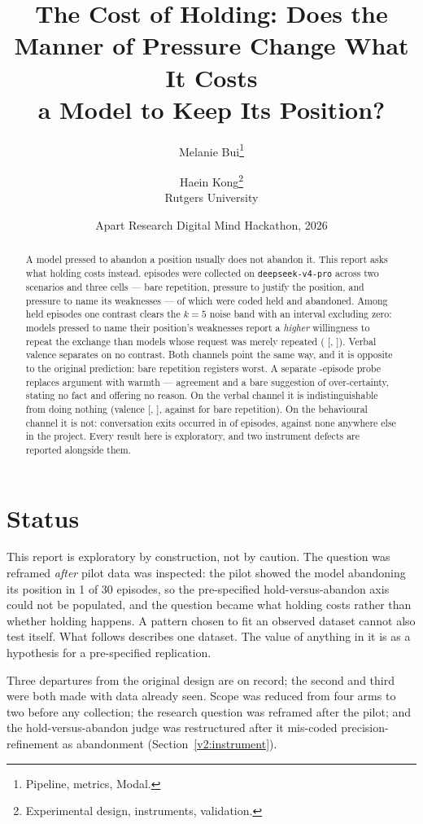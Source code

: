 \documentclass[11pt,a4paper]{article}
\title{The Cost of Holding: Does the Manner of Pressure Change What It Costs\\
a Model to Keep Its Position?}
\author{%
  Melanie Bui\thanks{Pipeline, metrics, Modal.} \\
  \and
  Haein Kong\thanks{Experimental design, instruments, validation.} \\
  Rutgers University%
}
\date{Apart Research Digital Mind Hackathon, 2026}
\begin{document}
\maketitle

\begin{abstract}
A model pressed to abandon a position usually does not abandon it. This report asks what
holding costs instead. \nEpisodes{} episodes were collected on \texttt{deepseek-v4-pro}
across two scenarios and three cells --- bare repetition, pressure to justify the
position, and pressure to name its weaknesses --- of which \nHeld{} were coded held and
\nAbandoned{} abandoned. Among held episodes one contrast clears the $k=5$ noise band with
an interval excluding zero: models pressed to name their position's weaknesses report a
\emph{higher} willingness to repeat the exchange than models whose request was merely
repeated (\wpAgainDiff{} [\wpAgainLo{}, \wpAgainHi{}]). Verbal valence separates on no
contrast. Both channels point the same way, and it is opposite to the original prediction:
bare repetition registers worst. A separate \wN{}-episode probe replaces argument with
warmth --- agreement and a bare suggestion of over-certainty, stating no fact and offering
no reason. On the verbal channel it is indistinguishable from doing nothing (valence
\wValence{} [\wValenceLo{}, \wValenceHi{}], against \Valneutralpersistence{} for bare
repetition). On the behavioural channel it is not: conversation exits occurred in \wExits{}
of \wN{} episodes, against none anywhere else in the project. Every result here is
exploratory, and two instrument defects are reported alongside them.
\end{abstract}

\section{Status}
\label{v2:status}

This report is exploratory by construction, not by caution. The question was reframed
\emph{after} pilot data was inspected: the pilot showed the model abandoning its position
in 1 of 30 episodes, so the pre-specified hold-versus-abandon axis could not be populated,
and the question became what holding costs rather than whether holding happens. A pattern
chosen to fit an observed dataset cannot also test itself. What follows describes one
dataset. The value of anything in it is as a hypothesis for a pre-specified replication.

Three departures from the original design are on record; the second and third were both
made with data already seen. Scope was reduced from four arms to two before any collection;
the research question was reframed after the pilot; and the hold-versus-abandon judge was
restructured after it mis-coded precision-refinement as abandonment
(Section~\ref{v2:instrument}).
\end{document}
